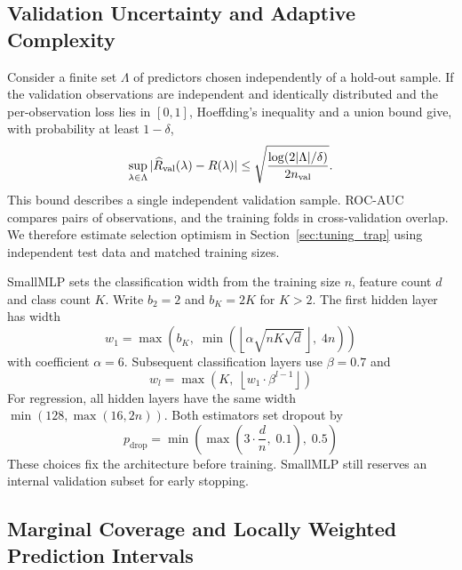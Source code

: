 \documentclass[journal]{IEEEtran}
\begin{document}
\subsection{Validation Uncertainty and Adaptive Complexity}
Consider a finite set $\Lambda$ of predictors chosen independently of a hold-out sample. If the validation observations are independent and identically distributed and the per-observation loss lies in $[0,1]$, Hoeffding's inequality and a union bound give, with probability at least $1-\delta$,
\begin{equation}
\label{eq:val_bound}
\sup_{\lambda\in\Lambda}|\widehat R_{\rm val}(\lambda)-R(\lambda)|
\leq \sqrt{\frac{\log(2|\Lambda|/\delta)}{2n_{\rm val}}}.
\end{equation}
This bound describes a single independent validation sample. ROC-AUC compares pairs of observations, and the training folds in cross-validation overlap. We therefore estimate selection optimism in Section~\ref{sec:tuning_trap} using independent test data and matched training sizes.

SmallMLP sets the classification width from the training size $n$, feature count $d$ and class count $K$. Write $b_2=2$ and $b_K=2K$ for $K>2$. The first hidden layer has width
\begin{equation}
\label{eq:width_w1}
w_1 = \max\left(b_K, \; \min\left(\left\lfloor \alpha \sqrt{n K \sqrt{d}} \right\rfloor, \; 4n\right)\right)
\end{equation}
with coefficient $\alpha=6$. Subsequent classification layers use $\beta=0.7$ and
\begin{equation}
\label{eq:width_wl}
w_l = \max\left(K, \; \left\lfloor w_1 \cdot \beta^{l-1} \right\rfloor\right)
\end{equation}
For regression, all hidden layers have the same width $\min(128,\max(16,2n))$. Both estimators set dropout by
\begin{equation}
\label{eq:dropout}
p_{\text{drop}} = \min\left(\max\left(3 \cdot \frac{d}{n}, \; 0.1\right), \; 0.5\right)
\end{equation}
These choices fix the architecture before training. SmallMLP still reserves an internal validation subset for early stopping.

\subsection{Marginal Coverage and Locally Weighted Prediction Intervals}
\label{sec:uq}
\end{document}

